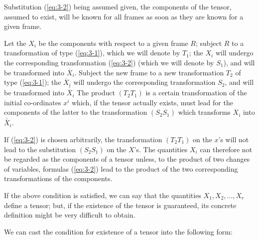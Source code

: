 Substitution (\ref{eq:3-2}) being assumed given, the components of the tensor, assumed to exist, will be known for all frames as soon as they are known for a given frame.

Let the $X_i$ be the components with respect to a given frame $R$; subject $R$ to a transformation of type (\ref{eq:3-1}), which we will denote by $T_1$; the $X_i$ will  undergo the corresponding transformation (\ref{eq:3-2}) (which we will denote by $S_1$), and will be transformed into $\overline X_i$. Subject the new frame to a new transformation $T_2$ of type (\ref{eq:3-1}); the $\overline X_i$ will undergo the corresponding transformation $S_2$, and will be transformed into $\overline{\overline X}_i$ The product $(T_2 T_1)$ is a certain transformation of the initial co-ordinates $x^i$  which, if the tensor actually exists, must lead for the components of the latter to the transformation $(S_2S_1)$ which transforms $X_i$ into $\overline{\overline X}_i$.

If (\ref{eq:3-2}) is chosen arbitrarily, the transformation $(T_2 T_1)$ on the $x$'s will not lead to the substitution $(S_2 S_1)$ on the $X$'s. The quantities $X_i$ can therefore not be regarded as the components of a tensor unless, to the product of two changes of variables, formulas (\ref{eq:3-2}) lead to the product of the two corresponding transformations of the components.

If the above condition is satisfied, we can say that the quantities $X_1, X_2,...,X_r$ define a tensor; but, if the existence of the tensor is guaranteed, its concrete definition might be very difficult to obtain.

We can cast the condition for existence of a tensor into the following form: 

